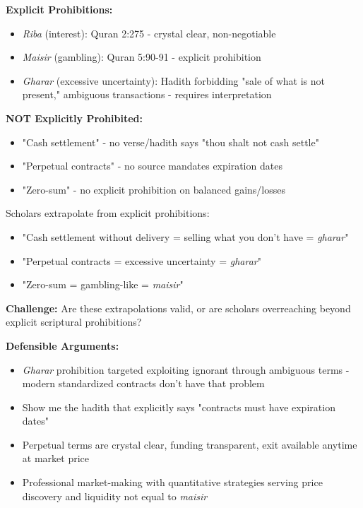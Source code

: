 \documentclass[10pt,twocolumn]{article}
\begin{document}
\textbf{Explicit Prohibitions:}
\begin{itemize}
    \item \textit{Riba} (interest): Quran 2:275 - crystal clear, non-negotiable
    \item \textit{Maisir} (gambling): Quran 5:90-91 - explicit prohibition
    \item \textit{Gharar} (excessive uncertainty): Hadith forbidding "sale of what is not present," ambiguous transactions - requires interpretation
\end{itemize}

\textbf{NOT Explicitly Prohibited:}
\begin{itemize}
    \item "Cash settlement" - no verse/hadith says "thou shalt not cash settle"
    \item "Perpetual contracts" - no source mandates expiration dates
    \item "Zero-sum" - no explicit prohibition on balanced gains/losses
\end{itemize}

Scholars extrapolate from explicit prohibitions:
\begin{itemize}
    \item "Cash settlement without delivery = selling what you don't have = \textit{gharar}"
    \item "Perpetual contracts = excessive uncertainty = \textit{gharar}"
    \item "Zero-sum = gambling-like = \textit{maisir}"
\end{itemize}

\textbf{Challenge:} Are these extrapolations valid, or are scholars overreaching beyond explicit scriptural prohibitions?

\textbf{Defensible Arguments:}
\begin{itemize}
    \item \textit{Gharar} prohibition targeted exploiting ignorant through ambiguous terms - modern standardized contracts don't have that problem
    \item Show me the hadith that explicitly says "contracts must have expiration dates"
    \item Perpetual terms are crystal clear, funding transparent, exit available anytime at market price
    \item Professional market-making with quantitative strategies serving price discovery and liquidity not equal to \textit{maisir}
\end{itemize}
\end{document}
